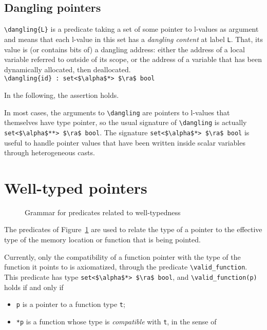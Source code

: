 \subsection{Dangling pointers}
\label{sec:dangling_pointers}
\lstinline|\dangling{L}|
is a predicate taking a set of some pointer to l-values as
argument and means that each l-value in this set has a \emph{dangling
  content} at label \lstinline|L|. That, its value is (or contains bits
of) a dangling address: either the address of a local
variable referred to outside of its scope, or the address of a variable that
has been dynamically allocated, then deallocated.
\\ \makebox[5mm]{} \lstinline|\dangling{id} : set<$\alpha$*> $\ra$ bool|

\begin{example}
  In the following, the assertion holds.
\end{example}

In most cases, the arguments to \lstinline|\dangling| are pointers to
l-values that themselves have type pointer, so the usual signature
of \lstinline|\dangling| is actually
\lstinline|set<$\alpha$**> $\ra$ bool|.
The signature \lstinline|set<$\alpha$*> $\ra$ bool| is useful to handle
pointer values that have been written inside scalar variables through
heterogeneous casts.


\section{Well-typed pointers}
\label{sec:welltyped}
\experimental
{}

\begin{figure}[h]
  \begin{cadre}
      
    \end{cadre}
  \caption{Grammar for predicates related to well-typedness }
\label{fig:gram:welltyped}
\end{figure}

The predicates of Figure~\ref{fig:gram:welltyped} are used to relate
the type of a pointer to the effective type of the memory location or function
that is being pointed.

Currently, only the compatibility of a function pointer with the type of
the function it points to is axiomatized, through the predicate
\lstinline|\valid_function|. This predicate has type
\lstinline|set<$\alpha$*> $\ra$ bool|,
and \lstinline|\valid_function(p)| holds if and only if
\begin{itemize}
\item \lstinline|p| is a pointer to a function type \lstinline|t|;
\item \lstinline|*p| is a function whose type is \emph{compatible}
  with \lstinline|t|, in the sense of \cite[\S6.2.7]{standardc99}
\end{itemize}

